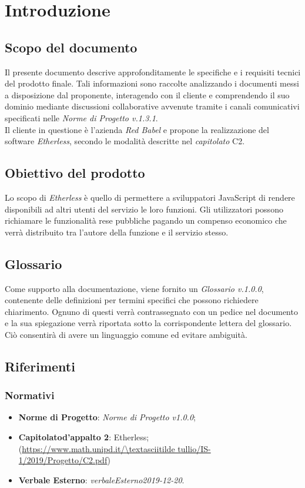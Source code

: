 \section{Introduzione}

\subsection{Scopo del documento}
Il presente documento descrive approfonditamente le specifiche e i requisiti tecnici del prodotto finale. Tali informazioni sono raccolte analizzando i documenti messi a disposizione dal proponente, interagendo con il cliente e comprendendo il suo dominio mediante discussioni collaborative avvenute tramite i canali comunicativi specificati nelle \textit{Norme di Progetto v.1.3.1}.\\
Il cliente in questione è l'azienda \textit{Red Babel} e propone la realizzazione del software \textit{Etherless}, secondo le modalità descritte nel \textit{capitolato\glo} C2.

\subsection{Obiettivo del prodotto}
Lo scopo di \textit{Etherless} è quello di permettere a sviluppatori JavaScript di rendere disponibili ad altri utenti del servizio le loro funzioni. Gli utilizzatori possono richiamare le funzionalità rese pubbliche pagando un compenso economico che verrà distribuito tra l'autore della funzione e il servizio stesso.
	
\subsection{Glossario}
Come supporto alla documentazione, viene fornito un \textit{Glossario v.1.0.0}, contenente delle definizioni per termini specifici che possono richiedere chiarimento. Ognuno di questi verrà contrassegnato con un pedice \glo nel documento e la sua spiegazione verrà riportata sotto la corrispondente lettera del glossario. Ciò consentirà di avere un linguaggio comune ed evitare ambiguità. 
	
\subsection{Riferimenti}
\subsubsection{Normativi}
	\begin{itemize}
		\item \textbf{Norme di Progetto}: \textit{Norme di Progetto v1.0.0};
		\item \textbf{Capitolato\glo d'appalto 2}: Etherless;\\ 
			(\url{https://www.math.unipd.it/\textasciitilde tullio/IS-1/2019/Progetto/C2.pdf})
		\item \textbf{Verbale Esterno}: \textit{verbaleEsterno2019-12-20}.
	\end{itemize}
